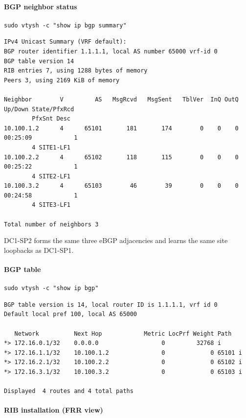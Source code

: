 \documentclass[11pt]{article}
\begin{document}
\paragraph{BGP neighbor status}

\begin{verbatim}
sudo vtysh -c "show ip bgp summary"
\end{verbatim}

\begin{verbatim}
IPv4 Unicast Summary (VRF default):
BGP router identifier 1.1.1.1, local AS number 65000 vrf-id 0
BGP table version 14
RIB entries 7, using 1288 bytes of memory
Peers 3, using 2169 KiB of memory

Neighbor        V         AS   MsgRcvd   MsgSent   TblVer  InQ OutQ  Up/Down State/PfxRcd   
        PfxSnt Desc
10.100.1.2      4      65101       181       174        0    0    0 00:25:09            1
        4 SITE1-LF1
10.100.2.2      4      65102       118       115        0    0    0 00:25:22            1
        4 SITE2-LF1
10.100.3.2      4      65103        46        39        0    0    0 00:24:58            1
        4 SITE3-LF1

Total number of neighbors 3
\end{verbatim}

DC1-SP2 forms the same three eBGP adjacencies and learns the same site loopbacks as DC1-SP1.

\paragraph{BGP table}

\begin{verbatim}
sudo vtysh -c "show ip bgp"
\end{verbatim}

\begin{verbatim}
BGP table version is 14, local router ID is 1.1.1.1, vrf id 0
Default local pref 100, local AS 65000

   Network          Next Hop            Metric LocPrf Weight Path
*> 172.16.0.1/32    0.0.0.0                  0         32768 i
*> 172.16.1.1/32    10.100.1.2               0             0 65101 i
*> 172.16.2.1/32    10.100.2.2               0             0 65102 i
*> 172.16.3.1/32    10.100.3.2               0             0 65103 i

Displayed  4 routes and 4 total paths
\end{verbatim}

\paragraph{RIB installation (FRR view)}
\end{document}
